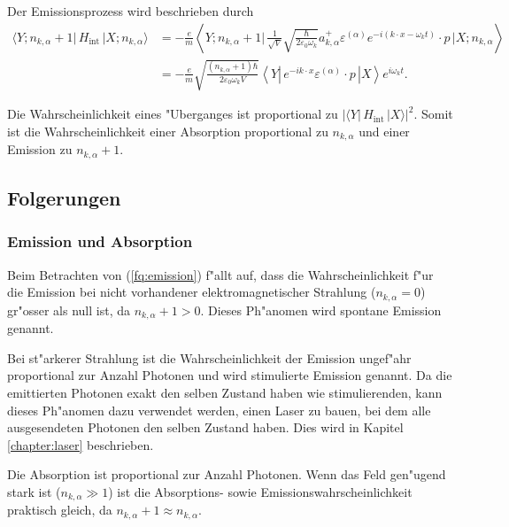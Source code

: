\begin{refsection}
Der Emissionsprozess wird beschrieben durch
\begin{equation} \label{fq:emission}
\begin{split}
\langle Y; n_{k,\alpha} + 1 |\, H_{\text{int}} \,| X; n_{k,\alpha} \rangle &= 
-\frac{e}{m} \left\langle Y; n_{k,\alpha} + 1 \biggl| 
\, \frac{1}{\sqrt{V}} \sqrt{\frac{\hbar}{2 \varepsilon_0 \omega_k}}a^+_{k,\alpha} \varepsilon^{(\alpha)} e^{-i(k \cdot x-\omega_k t)} \cdot p \,
\biggl| X; n_{k,\alpha} \right\rangle\\
&= -\frac{e}{m} \sqrt{\frac{ (n_{k,\alpha}+1) \hbar}{2 \varepsilon_0 \omega_k V}} \left\langle Y \left| 
\, e^{-ik \cdot x} \varepsilon^{(\alpha)} \cdot p \,
\right| X \right\rangle e^{i\omega_k t}.
\end{split}
\end{equation}

Die Wahrscheinlichkeit eines "Uberganges ist proportional zu $| \langle Y| \, H_{\text{int}} \, |X \rangle |^2$.
Somit ist die Wahrscheinlichkeit einer Absorption proportional zu $n_{k,\alpha}$ und einer Emission zu $n_{k,\alpha}+1$.

\subsection{Folgerungen}
\subsubsection{Emission und Absorption}
Beim Betrachten von (\ref{fq:emission}) f"allt auf, dass die Wahrscheinlichkeit f"ur die Emission bei nicht vorhandener elektromagnetischer Strahlung ($n_{k,\alpha} = 0$) gr"osser als null ist, da $n_{k,\alpha}+1 > 0$. Dieses Ph"anomen wird spontane Emission genannt.

Bei st"arkerer Strahlung ist die Wahrscheinlichkeit der Emission ungef"ahr proportional zur Anzahl Photonen und wird stimulierte Emission genannt. Da die emittierten Photonen exakt den selben Zustand haben wie stimulierenden, kann dieses Ph"anomen dazu verwendet werden, einen Laser zu bauen, bei dem alle ausgesendeten Photonen den selben Zustand haben. Dies wird in Kapitel \ref{chapter:laser} beschrieben.

Die Absorption ist proportional zur Anzahl Photonen. Wenn das Feld gen"ugend stark ist ($n_{k,\alpha} \gg 1$) ist die Absorptions- sowie Emissionswahrscheinlichkeit praktisch gleich, da $n_{k,\alpha}+1 \approx n_{k,\alpha}$. 


\end{refsection}
